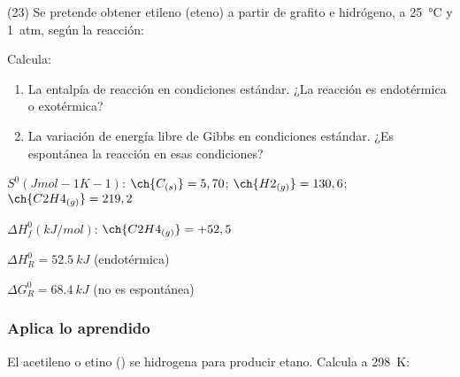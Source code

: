 \documentclass[10pt]{article}
\newenvironment{gexdatos}{
  \noindent\makebox[0pt][r]{\textit{Datos:}}
  }{\vspace{5pt}}
\begin{document}
\begin{multicols}{2}
\begin{exercise}[
    tags    = {},
    topics  = {química,química básica},
    source  = {FQ 1B MGH 2016, p85, e26},
  ]

  (23) Se pretende obtener etileno (eteno) a partir de grafito e
  hidrógeno, a \SI{25}{\celsius} y \SI{1}{atm}, según la reacción:


  Calcula:

  \begin{enumerate}
    \item La entalpía de reacción en condiciones estándar. ¿La reacción es endotérmica o exotérmica?
    \item La variación de energía libre de Gibbs en condiciones
    estándar. ¿Es espontánea la reacción en esas condiciones?
  \end{enumerate}

  \begin{gexdatos}
    \( S^0 (J mol-1 K-1) \):
    \( \ch{C_{(s)}} = 5,70 \);
    \( \ch{H2_{(g)}} = 130,6 \);
    \( \ch{C2H4_{(g)}}= 219,2 \)

    \( \Delta H^0_f (\si{kJ/mol}) \):
    \( \ch{C2H4_{(g)}} = +52,5 \)
  \end{gexdatos}

\end{exercise}

\begin{solution}
  \begin{enumerate*}
    \item \( \Delta H^0_R = \SI{+52.5}{kJ} \) (endotérmica)
    \item \( \Delta G^0_R = \SI{+68.4}{kJ} \) (no es espontánea)
  \end{enumerate*}
\end{solution}



\subsubsection{Aplica lo aprendido}





\begin{exercise}[
    tags    = {},
    topics  = {química,química básica},
    source  = {FQ 1B MGH 2016, p85, e26},
  ]

  El acetileno o etino () se hidrogena para producir etano. Calcula a \SI{298}{\kelvin}:


\end{exercise}
\end{multicols}
\end{document}

